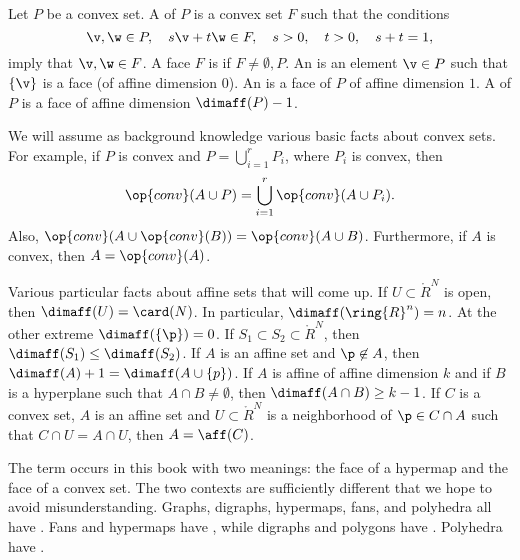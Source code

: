 \begin{definition}
Let $P$ be a convex set.  A  of $P$ is a convex set
$F$ such that the conditions
\begin{displaymath}
\v,\w\in P,\quad s \v + t \w \in F,\quad s>0,\quad t>0,\quad s+t = 1,
\end{displaymath} 
imply that $\v,\w\in F$.  A face $F$ is  if $F\ne
\emptyset,P$.  An  is an element $\v\in P$ such that
$\{\v\}$ is a face (of affine dimension $0$).  An   is a face of $P$ of
affine dimension $1$.  A  of $P$ is a 
face of affine dimension $\dimaff(P)-1$.  %
\end{definition}

\begin{remark}\label{rem:convex-background}
We will assume as background knowledge various basic facts about convex sets.
For example,
if $P$ is convex and $P = \bigcup_{i=1}^r P_i$, where $P_i$ is convex, then
\begin{displaymath}
\op{conv}(A\cup P ) = \bigcup_{i=1}^r\op{conv}(A\cup P_i).
\end{displaymath}
Also, $\op{conv}(A\cup \op{conv}(B)) = \op{conv}(A \cup B)$.
Furthermore, if $A$ is convex, then $A = \op{conv}(A)$.
\end{remark}


\begin{remark}\label{rem:affine-background}
Various particular facts about affine sets that will come up.
If $U\subset\ring{R}^N$ is open, then $\dimaff(U) = \card(N)$.  In particular,
$\dimaff(\ring{R}^n) = n$.  At the other extreme $\dimaff(\{\p\}) = 0$.
If $S_1\subset S_2\subset\ring{R}^N$, then $\dimaff(S_1) \le \dimaff(S_2)$.
If $A$ is an affine set and $\p\not\in A$, then $\dimaff(A) +1 = \dimaff(A\cup\{p\})$.
If $A$ is affine of affine dimension $k$ and if $B$ is a hyperplane such that $A\cap B\ne\emptyset$, then $\dimaff (A\cap B)\ge k-1$.
If $C$ is a convex set, $A$ is an affine set and $U\subset \ring{R}^N$ 
is a neighborhood of $\p\in C\cap A$ such that $C\cap U = A\cap U$, then
$A=\aff(C)$.
\end{remark}


\begin{remark}\label{remark:face} 
The term  occurs in this book with two meanings: the
face of a hypermap and the face of a convex set.  The two contexts
are sufficiently different that we hope to avoid misunderstanding.
Graphs, digraphs, hypermaps, fans, and polyhedra all have .
Fans and hypermaps have , while digraphs and polygons 
have .  Polyhedra have .
\end{remark}

